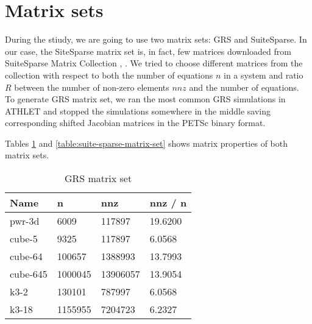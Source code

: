 \section{Matrix sets} \label{subseq:matrix-sets}

During the stiudy, we are going to use two matrix sets: GRS and SuiteSparse. In our case, the SiteSparse matrix set is, in fact, few matrices downloaded from SuiteSparse Matrix Collection \cite{sparse-matrix-collection:1}, \cite{sparse-matrix-collection:2}. We tried to choose different matrices from the collection with respect to both the number of equations $n$ in a system and ratio $R$ between the number of non-zero elements $nnz$ and the number of equations.\\ 


To generate GRS matrix set, we ran the most common GRS simulations in ATHLET and stopped the simulations somewhere in the middle saving corresponding shifted Jacobian matrices in the PETSc binary format.\\

Tables \ref{table:grs-matrix-set}  and \ref{table:suite-sparse-matrix-set} shows matrix properties of both matrix sets.\\


\begin{table}[ht]
\centering
\begin{tabular}{|l|l|l|l|}
\hline
Name     & n       & nnz      & nnz / n \\ \hline
pwr-3d   & 6009    & 117897   & 19.6200 \\ \hline
cube-5   & 9325    & 117897   & 6.0568  \\ \hline
cube-64  & 100657  & 1388993  & 13.7993 \\ \hline
cube-645 & 1000045 & 13906057 & 13.9054 \\ \hline
k3-2     & 130101  & 787997   & 6.0568  \\ \hline
k3-18    & 1155955 & 7204723  & 6.2327  \\ \hline
\end{tabular}
\caption{GRS matrix set}
\label{table:grs-matrix-set}
\end{table}



